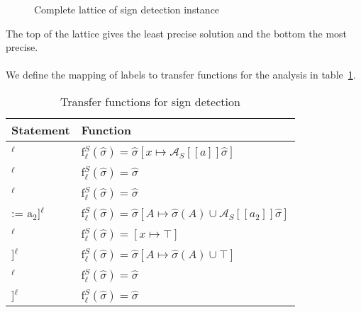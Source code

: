  \begin{figure}
 \centering
  \caption{Complete lattice of sign detection instance}
 
  \label{fig:sign_detection_complete_lattice}
 \end{figure}
\noindent The top of the lattice gives the least precise solution and the bottom the most precise.
\\\\
We define the mapping of labels to transfer functions for the analysis in table~\ref{table:sign_detection_functions}.
\begin{table}[h]
\begin{tabular}{| l | l |}
  \hline
  Statement & Function \\
  \hline
  \hline
  [x := a]$^\ell$ & f$_\ell^S (\widehat{\sigma}) = \widehat{\sigma}[x \mapsto \mathcal{A}_S[\![a]\!] \widehat{\sigma} ]$ \\
  \hline
 [skip]$^\ell$ & f$_\ell^S (\widehat{\sigma}) = \widehat{\sigma}$\\
  \hline
 [b]$^\ell$ & f$_\ell^S (\widehat{\sigma}) = \widehat{\sigma}$\\
  \hline
  [A[a$_1$] := a$_2$]$^\ell$ & f$_\ell^S (\widehat{\sigma}) = \widehat{\sigma}[A\mapsto \widehat{\sigma}(A)\cup \mathcal{A}_S[\![a_2]\!] \widehat{\sigma}]$\\
  \hline
  [read x]$^\ell$ & f$_\ell^S (\widehat{\sigma}) = [x \mapsto \top]$ \\
  \hline
  [read A[a]]$^\ell$ & f$_\ell^S (\widehat{\sigma}) =  \widehat{\sigma}[A\mapsto \widehat{\sigma}(A)\cup \top]$\\
  \hline
  [write x]$^\ell$ & f$_\ell^S (\widehat{\sigma}) = \widehat{\sigma}$\\
  \hline
  [write A[n]]$^\ell$ & f$_\ell^S (\widehat{\sigma}) = \widehat{\sigma}$\\
  \hline
\end{tabular}
\centering
\caption{Transfer functions for sign detection}
\label{table:sign_detection_functions}
\end{table}

